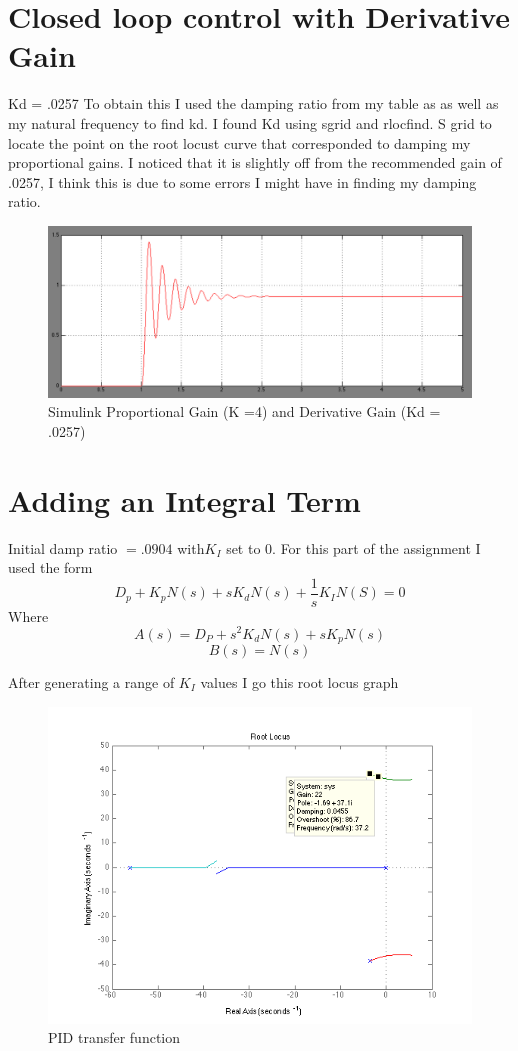 \documentclass[english]{article}
\begin{document}
\section{Closed loop control with Derivative Gain}
Kd = .0257   
To obtain this I used the damping ratio from my table as as well as my natural frequency to find kd. 
I found Kd using sgrid and rlocfind. S grid to locate the point on the root locust curve that corresponded to damping my proportional gains. I noticed that it is slightly off from the recommended gain of .0257, I think this is due to some errors I might have in finding my damping ratio. 
\begin{figure}[h!]
\includegraphics[width = \linewidth]{sim3.png}
\caption{Simulink Proportional Gain (K =4) and Derivative Gain (Kd = .0257) }
\end{figure}
\FloatBarrier


\section{Adding an Integral Term}
Initial damp ratio  $ = .0904$ with$ K_I$ set to  0.  
For this part of the assignment I used the form 
$$ D_p + K_pN(s) + sK_dN(s) + \frac{1}{s}K_IN(S) = 0 
$$ 
Where 
$$ A(s) = D_P + s^2K_dN(s) + sK_pN(s) $$ 
$$ B(s) = N(s) $$

After generating a range of $K_I$ values  I go this root locus graph
\begin{figure}[h!]
\includegraphics[width = \linewidth]{rlocus_ki.png}
\caption{PID transfer function}
\end{figure}
\FloatBarrier 
\end{document}
